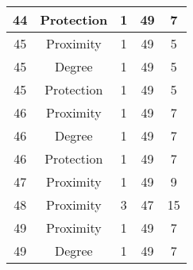 \documentclass[results.tex]{subfiles}
\begin{document}
\begin{center}
\begin{tabular}{| c || c | c | c | c |}
            \hline
            44                      & Protection                   & 1                      & 49                      & 7                    \\
            \hline
            45                      & Proximity                    & 1                      & 49                      & 5                    \\
            \hline
            45                      & Degree                       & 1                      & 49                      & 5                    \\
            \hline
            45                      & Protection                   & 1                      & 49                      & 5                    \\
            \hline
            46                      & Proximity                    & 1                      & 49                      & 7                    \\
            \hline
            46                      & Degree                       & 1                      & 49                      & 7                    \\
            \hline
            46                      & Protection                   & 1                      & 49                      & 7                    \\
            \hline
            47                      & Proximity                    & 1                      & 49                      & 9                    \\
            \hline
            48                      & Proximity                    & 3                      & 47                      & 15                   \\
            \hline
            49                      & Proximity                    & 1                      & 49                      & 7                    \\
            \hline
            49                      & Degree                       & 1                      & 49                      & 7                    \\
            \hline
        \end{tabular}
    \end{center}
\end{document}
